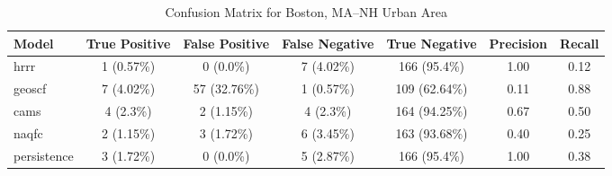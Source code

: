 \begin{table}[h!]
\centering
\begin{tabular}{lcccccc}
\hline
Model & True Positive & False Positive & False Negative & True Negative & Precision & Recall\\ \hline
hrrr & 1 (0.57\%) & 0 (0.0\%) & 7 (4.02\%) & 166 (95.4\%) & \cellcolor{green!25}1.00 & \cellcolor{red!25}0.12 \\ 
geoscf & 7 (4.02\%) & 57 (32.76\%) & 1 (0.57\%) & 109 (62.64\%) & \cellcolor{red!25}0.11 & \cellcolor{green!25}0.88 \\ 
cams & 4 (2.3\%) & 2 (1.15\%) & 4 (2.3\%) & 164 (94.25\%) & \cellcolor{red!25}0.67 & \cellcolor{green!25}0.50 \\ 
naqfc & 2 (1.15\%) & 3 (1.72\%) & 6 (3.45\%) & 163 (93.68\%) & \cellcolor{red!25}0.40 & \cellcolor{red!25}0.25 \\ 
persistence & 3 (1.72\%) & 0 (0.0\%) & 5 (2.87\%) & 166 (95.4\%) & 1.00 & 0.38 \\ 
\hline
\end{tabular}
\caption{Confusion Matrix for Boston, MA--NH Urban Area}
\end{table}
